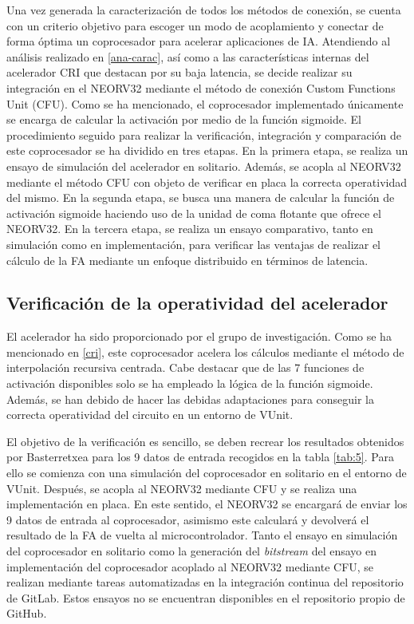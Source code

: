 \label{Integ}

Una vez generada la caracterización de todos los métodos de conexión, se cuenta con un criterio objetivo para escoger un modo de acoplamiento y conectar de forma óptima un coprocesador para acelerar aplicaciones de IA.
Atendiendo al análisis realizado en \ref{ana-carac}, así como a las características internas del acelerador CRI que destacan por su baja latencia, se decide realizar su integración en el NEORV32 mediante el método de conexión Custom Functions Unit (CFU).
Como se ha mencionado, el coprocesador implementado únicamente se encarga de calcular la activación por medio de la función sigmoide.
El procedimiento seguido para realizar la verificación, integración y comparación de este coprocesador se ha dividido en tres etapas. 
En la primera etapa, se realiza un ensayo de simulación del acelerador en solitario.
Además, se acopla al NEORV32 mediante el método CFU con objeto de verificar en placa la correcta operatividad del mismo.
En la segunda etapa, se busca una manera de calcular la función de activación sigmoide haciendo uso de la unidad de coma flotante que ofrece el NEORV32.
En la tercera etapa, se realiza un ensayo comparativo, tanto en simulación como en implementación, para verificar las ventajas de realizar el cálculo de la FA mediante un enfoque distribuido en términos de latencia.

\subsection{Verificación de la operatividad del acelerador}

El acelerador ha sido proporcionado por el grupo de investigación.
Como se ha mencionado en \ref{cri}, este coprocesador acelera los cálculos mediante el método de interpolación recursiva centrada.
Cabe destacar que de las 7 funciones de activación disponibles solo se ha empleado la lógica de la función sigmoide.
Además, se han debido de hacer las debidas adaptaciones para conseguir la correcta operatividad del circuito en un entorno de VUnit.

El objetivo de la verificación es sencillo, se deben recrear los resultados obtenidos por Basterretxea para los 9 datos de entrada recogidos en la tabla \ref{tab:5}.
Para ello se comienza con una simulación del coprocesador en solitario en el entorno de VUnit.
Después, se acopla al NEORV32 mediante CFU y se realiza una implementación en placa.
En este sentido, el NEORV32 se encargará de enviar los 9 datos de entrada al coprocesador, asimismo este calculará y devolverá el resultado de la FA de vuelta al microcontrolador.
Tanto el ensayo en simulación del coprocesador en solitario como la generación del \textit{bitstream} del ensayo en implementación del coprocesador acoplado al NEORV32 mediante CFU, se realizan mediante tareas automatizadas en la integración continua del repositorio de GitLab.
Estos ensayos no se encuentran disponibles en el repositorio propio de GitHub.

